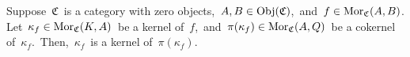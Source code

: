 \vskip 0.5cm
\begin{corollary}
\mbox{}
\vskip 0.1cm
\noindent
Suppose \,$\mathfrak{C}$\, is a category with zero objects,
\,$A, B \in \textnormal{Obj}(\mathfrak{C})$,\, and
\,$f \in \textnormal{Mor}_{\mathfrak{C}}(A,B)$.
Let \,$\kappa_{f} \in \textnormal{Mor}_{\mathfrak{C}}(K,A)$\, be a kernel of \,$f$,\,
and \,$\pi(\kappa_{f}) \in \textnormal{Mor}_{\mathfrak{C}}(A,Q)$\, be a cokernel of \,$\kappa_{f}$.\,
Then, \,$\kappa_{f}$\, is a kernel of \,$\pi(\kappa_{f})$.
\end{corollary}
%
%
%
%

